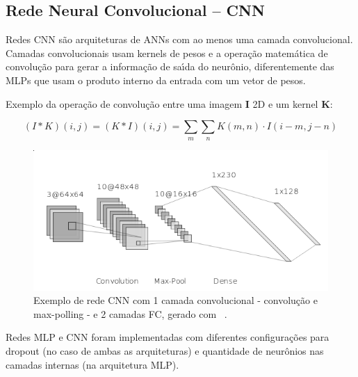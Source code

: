 \documentclass[a0,portrait]{a0poster}
\begin{document}
\begin{multicols}{2}
    \subsection*{\Large\color{Indigo}Rede Neural Convolucional -- CNN}

 Redes CNN são arquiteturas de ANNs com ao menos uma camada convolucional. Camadas convolucionais usam kernels de pesos e a operação matemática de convolução para gerar a informação de saı́da do neurônio, diferentemente das MLPs que usam o produto interno da entrada com um vetor de pesos.

  Exemplo da operação de convolução entre uma imagem $\mathbf{I}$ 2D e um kernel $\mathbf{K}$:

\begin{equation}
  (I*K)(i, j) = (K*I)(i,j) = \sum_m\sum_n K(m, n) \cdot I(i-m, j-n)
\end{equation}


  \begin{figure}[H]
        {\centering
        \includegraphics[width=.6\linewidth]{cnn_ex.png}
        \caption{Exemplo de rede CNN com 1 camada convolucional - convolução e max-polling - e 2 camadas FC, gerado com ~\cite{nnsvg}.}
        \label{fig:cnn}\par}
  \end{figure}

  Redes MLP e CNN foram implementadas com diferentes configurações para dropout (no caso de ambas as arquiteturas) e quantidade de neurônios nas camadas internas (na arquitetura MLP).


\end{multicols}
\end{document}
